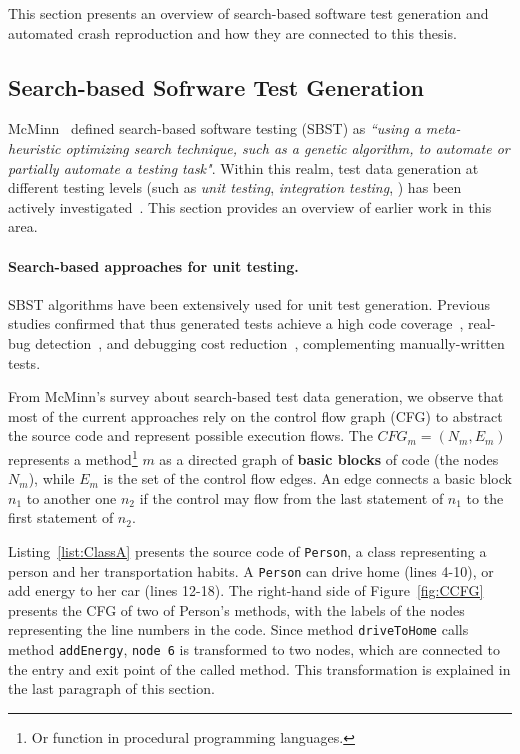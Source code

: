 This section presents an overview of search-based software test generation and automated crash reproduction and how they are connected to this thesis.

\subsection{Search-based Sofrware Test Generation}

McMinn~\cite{McMinn2004} defined search-based software testing (SBST) as \textit{``using a meta-heuristic optimizing search technique, such as a genetic algorithm, to automate or partially automate a testing task"}.
Within this realm, test data generation at different testing levels (such as \textit{unit testing}, \textit{integration testing}, \etc) has been actively investigated~\cite{McMinn2004}. This section 
provides an overview of earlier work in this area.

\paragraph{Search-based approaches for unit testing.}
SBST algorithms have been extensively used for unit test generation. Previous studies confirmed that thus generated tests achieve a high code coverage~\cite{Panichella2018a, Campos2018}, real-bug detection~\cite{almasi2017industrial}, and debugging cost reduction~\cite{soltani2017, Panichella2016}, complementing manually-written tests.

From McMinn's \cite{McMinn2004} survey about search-based test data generation, we observe that most of the current approaches rely on the control flow graph (CFG) to abstract the source code and represent possible execution flows. The $CFG_m=(N_m,E_m)$ represents a method\footnote{Or function in procedural programming languages.} $m$ as a directed graph of \textbf{basic blocks} of code (the nodes $N_m$), while $E_m$ is the set of the control flow edges. An edge connects a basic block $n_1$ to another one $n_2$ if the control may flow from the last statement of $n_1$ to the first statement of $n_2$. 

Listing~\ref{list:ClassA} presents the source code of \texttt{Person}, a class representing a person and her transportation habits. A \texttt{Person} can drive home (lines 4-10), or add energy to her car (lines 12-18). The right-hand side of Figure~\ref{fig:CCFG} presents the CFG of two of Person's methods, with the labels of the nodes representing the line numbers in the code. Since method \texttt{driveToHome} calls method \texttt{addEnergy}, \texttt{node 6} is transformed to two nodes, which are connected to the entry and exit point of the called method. This transformation is explained in the last paragraph of this section.  

